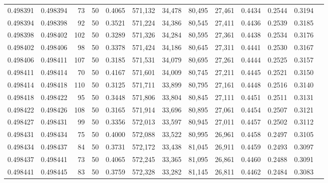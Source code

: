 \begin{tabular}{rrrrrrrrrrrrr}
0.498391 & 0.498394 &    73 &  50 &                                     0.4065 & 571,132 &  34,478 &  80,495 &  27,461 & 0.4434 & 0.2544 & 0.3194 \\
0.498394 & 0.498398 &    92 &  50 &                                     0.3521 & 571,224 &  34,386 &  80,545 &  27,411 & 0.4436 & 0.2539 & 0.3185 \\
0.498398 & 0.498402 &   102 &  50 &                                     0.3289 & 571,326 &  34,284 &  80,595 &  27,361 & 0.4438 & 0.2534 & 0.3176 \\
0.498402 & 0.498406 &    98 &  50 &                                     0.3378 & 571,424 &  34,186 &  80,645 &  27,311 & 0.4441 & 0.2530 & 0.3167 \\
0.498406 & 0.498411 &   107 &  50 &                                     0.3185 & 571,531 &  34,079 &  80,695 &  27,261 & 0.4444 & 0.2525 & 0.3157 \\
0.498411 & 0.498414 &    70 &  50 &                                     0.4167 & 571,601 &  34,009 &  80,745 &  27,211 & 0.4445 & 0.2521 & 0.3150 \\
0.498414 & 0.498418 &   110 &  50 &                                     0.3125 & 571,711 &  33,899 &  80,795 &  27,161 & 0.4448 & 0.2516 & 0.3140 \\
0.498418 & 0.498422 &    95 &  50 &                                     0.3448 & 571,806 &  33,804 &  80,845 &  27,111 & 0.4451 & 0.2511 & 0.3131 \\
0.498422 & 0.498426 &   108 &  50 &                                     0.3165 & 571,914 &  33,696 &  80,895 &  27,061 & 0.4454 & 0.2507 & 0.3121 \\
0.498427 & 0.498431 &    99 &  50 &                                     0.3356 & 572,013 &  33,597 &  80,945 &  27,011 & 0.4457 & 0.2502 & 0.3112 \\
0.498431 & 0.498434 &    75 &  50 &                                     0.4000 & 572,088 &  33,522 &  80,995 &  26,961 & 0.4458 & 0.2497 & 0.3105 \\
0.498434 & 0.498437 &    84 &  50 &                                     0.3731 & 572,172 &  33,438 &  81,045 &  26,911 & 0.4459 & 0.2493 & 0.3097 \\
0.498437 & 0.498441 &    73 &  50 &                                     0.4065 & 572,245 &  33,365 &  81,095 &  26,861 & 0.4460 & 0.2488 & 0.3091 \\
0.498441 & 0.498445 &    83 &  50 &                                     0.3759 & 572,328 &  33,282 &  81,145 &  26,811 & 0.4462 & 0.2484 & 0.3083 \\

\end{tabular}
